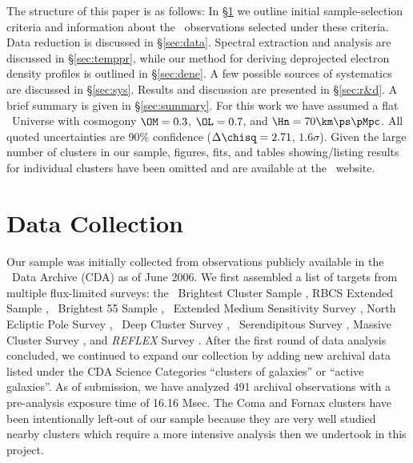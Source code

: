 \documentclass{emulateapj}
\begin{document}
The structure of this paper is as follows: In \S\ref{sec:sample} we
outline initial sample-selection criteria and information about the
\chandra\ observations selected under these criteria. Data reduction
is discussed in \S\ref{sec:data}. Spectral extraction and analysis are
discussed in \S\ref{sec:temppr}, while our method for deriving
deprojected electron density profiles is outlined in
\S\ref{sec:dene}. A few possible sources of systematics are discussed
in \S\ref{sec:sys}. Results and discussion are presented in
\S\ref{sec:r&d}. A brief summary is given in \S\ref{sec:summary}. For
this work we have assumed a flat \LCDM\ Universe with cosmogony
$\OM=0.3$, $\OL=0.7$, and $\Hn=70\km\ps\pMpc$. All quoted
uncertainties are 90\% confidence ($\Delta\chisq = 2.71$,
$1.6\sigma$). Given the large number of clusters in our sample,
figures, fits, and tables showing/listing results for individual
clusters have been omitted and are available at the \accept\ website.

\section{Data Collection}
\label{sec:sample}

Our sample was initially collected from observations publicly
available in the \chandra\ Data Archive (CDA) as of June 2006. We
first assembled a list of targets from multiple flux-limited surveys:
the \rosat\ Brightest Cluster Sample \citep{1998MNRAS.301..881E}, RBCS
Extended Sample \citep{2000MNRAS.318..333E}, \rosat\ Brightest 55
Sample \citep{1990MNRAS.245..559E, 1998MNRAS.298..416P},
\einstein\ Extended Medium Sensitivity Survey
\citep{1990ApJS...72..567G}, North Ecliptic Pole Survey
\citep{2006ApJS..162..304H}, \rosat\ Deep Cluster Survey
\citep{1995ApJ...445L..11R}, \rosat\ Serendipitous Survey
\citep{1998ApJ...502..558V}, Massive Cluster Survey
\citep{2001ApJ...553..668E}, and {\it{REFLEX}} Survey
\citep{reflex}. After the first round of data analysis concluded, we
continued to expand our collection by adding new archival data listed
under the CDA Science Categories ``clusters of galaxies'' or ``active
galaxies''. As of submission, we have analyzed 491 archival
observations with a pre-analysis exposure time of 16.16 Msec. The Coma
and Fornax clusters have been intentionally left-out of our sample
because they are very well studied nearby clusters which require a
more intensive analysis then we undertook in this project.
\end{document}
